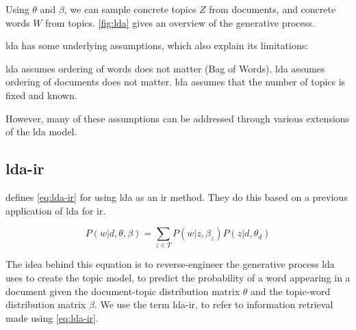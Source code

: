 Using $\theta$ and $\beta$, we can sample concrete topics $Z$ from documents, and concrete words $W$ from topics.
\autoref{fig:lda} gives an overview of the generative process.

\Gls{lda} has some underlying assumptions, which also explain its limitations\cite{blei2012topicmodels}:
\begin{itemize}
	\gls{lda} assumes ordering of words does not matter (Bag of Words).
	\gls{lda} assumes ordering of documents does not matter.
	\gls{lda} assumes that the number of topics is fixed and known.
\end{itemize}
However, many of these assumptions can be addressed through various extensions of the \gls{lda} model\cite{blei2012topicmodels}.

\subsection{\gls{lda}-\gls{ir}}
\citeauthor{yang2009topic}\cite{yang2009topic} defines \autoref{eq:lda-ir} for using \gls{lda} as an \gls{ir} method. 
They do this based on a previous application of \gls{lda} for \gls{ir}\cite{lda-ir}.

\begin{equation}\label{eq:lda-ir}
	P(w|d, \theta, \beta) = \sum_{z \in T} P(w|z,\beta_z) P(z|d,\theta_d)
\end{equation}

The idea behind this equation is to reverse-engineer the generative process \gls{lda} uses to create the topic model, to predict the probability of a word appearing in a document given the document-topic distribution matrix $\theta$ and the topic-word distribution matrix $\beta$.
We use the term \gls{lda}-\gls{ir}, to refer to information retrieval made using \autoref{eq:lda-ir}.
